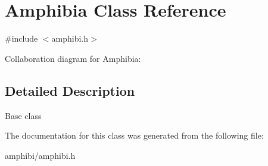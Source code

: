 \hypertarget{classAmphibia}{}\section{Amphibia Class Reference}
\label{classAmphibia}


{\ttfamily \#include $<$amphibi.\+h$>$}



Collaboration diagram for Amphibia\+:


\subsection{Detailed Description}
Base class 

The documentation for this class was generated from the following file\+:\begin{DoxyCompactItemize}
\item 
amphibi/amphibi.\+h\end{DoxyCompactItemize}
